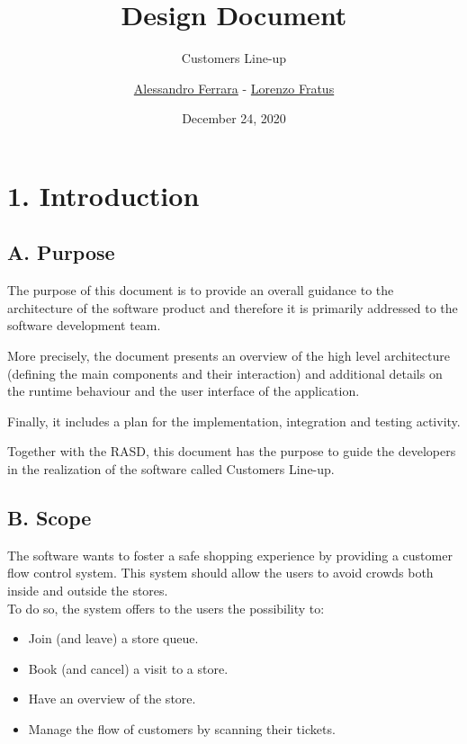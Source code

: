 
\graphicspath{ {assets/dd/} }

\title{Design Document}
\subtitle{Customers Line-up}
\author{\href{https://github.com/ferrohd}{Alessandro Ferrara} -
\href{https://github.com/lorenzofratus}{Lorenzo Fratus}}
\date{December 24, 2020}



\maketitle

\tableofcontents

\chapter{1. Introduction}

\section{A. Purpose}

The purpose of this document is to provide an overall guidance to the architecture of the software product and therefore it is primarily addressed to the software development team.

More precisely, the document presents an overview of the high level architecture (defining the main components and their interaction) and additional details on the runtime behaviour and the user interface of the application.

Finally, it includes a plan for the implementation, integration and testing activity.

Together with the RASD, this document has the purpose to guide the developers in the realization of the software called Customers Line-up.

\section{B. Scope}

The software wants to foster a safe shopping experience by providing a customer flow control system. This system should allow the users to avoid crowds both inside and outside the stores.\\
To do so, the system offers to the users the possibility to:

\begin{itemize}
    \item Join (and leave) a store queue.
    \item Book (and cancel) a visit to a store.
    \item Have an overview of the store.
    \item Manage the flow of customers by scanning their tickets.
\end{itemize}

